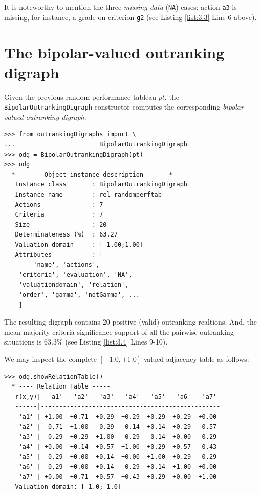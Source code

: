 It is noteworthy to mention the three \emph{missing data} (\texttt{NA}) cases: action \texttt{a3} is missing, for instance, a grade on criterion \texttt{g2} (see Listing \ref{list:3.3} Line 6 above).
    
\section{The bipolar-valued outranking digraph}
\label{sec:3.2}

Given the previous random performance tableau $pt$, the {\tt BipolarOutrankingDigraph} constructor computes the corresponding \emph{bipolar-valued outranking digraph}. 
\begin{lstlisting}[caption={Example of random bipolar-valued outranking digraph.},label=list:3.4]
>>> from outrankingDigraphs import \
...                       BipolarOutrankingDigraph
>>> odg = BipolarOutrankingDigraph(pt)
>>> odg
  *------- Object instance description ------*
   Instance class       : BipolarOutrankingDigraph
   Instance name        : rel_randomperftab
   Actions              : 7
   Criteria             : 7
   Size                 : 20
   Determinateness (%)  : 63.27
   Valuation domain     : [-1.00;1.00]
   Attributes           : [
        'name', 'actions', 
	'criteria', 'evaluation', 'NA',
	'valuationdomain', 'relation', 
	'order', 'gamma', 'notGamma', ...
	]
\end{lstlisting}
The resulting digraph contains 20 positive (valid) outranking realtions. And, the mean majority criteria significance support of all the pairwise outranking situations is $63.3\%$ (see Listing \ref{list:3.4}  Lines 9-10).

We may inspect the complete $[-1.0,+1.0]$-valued adjacency table as follows:
\begin{lstlisting}[caption={Inspecting the valued adjacency table.},label=list:3.5]
>>> odg.showRelationTable()
  * ---- Relation Table -----
   r(x,y)|  'a1'   'a2'   'a3'   'a4'   'a5'   'a6'   'a7'   
   ------|-------------------------------------------------
    'a1' | +1.00  +0.71  +0.29  +0.29  +0.29  +0.29  +0.00  
    'a2' | -0.71  +1.00  -0.29  -0.14  +0.14  +0.29  -0.57  
    'a3' | -0.29  +0.29  +1.00  -0.29  -0.14  +0.00  -0.29  
    'a4' | +0.00  +0.14  +0.57  +1.00  +0.29  +0.57  -0.43  
    'a5' | -0.29  +0.00  +0.14  +0.00  +1.00  +0.29  -0.29  
    'a6' | -0.29  +0.00  +0.14  -0.29  +0.14  +1.00  +0.00  
    'a7' | +0.00  +0.71  +0.57  +0.43  +0.29  +0.00  +1.00  
   Valuation domain: [-1.0; 1.0]
\end{lstlisting}

